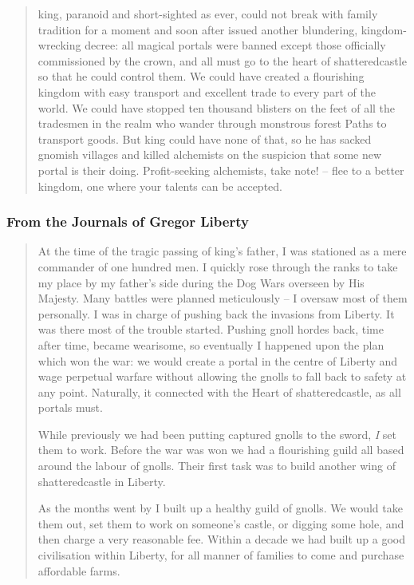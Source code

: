 \begin{multicols}{2}
\begin{quotation}
  \Gls{king}, paranoid and short-sighted as ever, could not break with family tradition for a moment and soon after issued another blundering, kingdom-wrecking decree: all magical portals were banned except those officially commissioned by the crown, and all must go to the heart of \gls{shatteredcastle} so that he could control them.
  We could have created a flourishing kingdom with easy transport and excellent trade to every part of the world.
  We could have stopped ten thousand blisters on the feet of all the tradesmen in the realm who wander through monstrous forest Paths to transport goods.
  But \gls{king} could have none of that, so he has sacked gnomish villages and killed alchemists on the suspicion that some new portal is their doing.
  Profit-seeking alchemists, take note! -- flee to a better kingdom, one where your talents can be accepted.

\end{quotation}

\subsubsection{From the Journals of Gregor Liberty}


\begin{quotation}

  At the time of the tragic passing of \gls{king}'s father, I was stationed as a mere commander of one hundred men.
  I quickly rose through the ranks to take my place by my father's side during the Dog Wars overseen by His Majesty.
  Many battles were planned meticulously -- I oversaw most of them personally.
  I was in charge of pushing back the invasions from Liberty.
  It was there most of the trouble started.
  Pushing gnoll hordes back, time after time, became wearisome, so eventually I happened upon the plan which won the war: we would create a portal in the centre of Liberty and wage perpetual warfare without allowing the gnolls to fall back to safety at any point.
  Naturally, it connected with the Heart of \gls{shatteredcastle}, as all portals must.

  While previously we had been putting captured gnolls to the sword, \emph{I} set them to work.
  Before the war was won we had a flourishing guild all based around the labour of gnolls.
  Their first task was to build another wing of \gls{shatteredcastle} in Liberty.

  As the months went by I built up a healthy guild of gnolls.
  We would take them out, set them to work on someone's castle, or digging some hole, and then charge a very reasonable fee.
  Within a decade we had built up a good civilisation within Liberty, for all manner of families to come and purchase affordable farms.


\end{quotation}
\end{multicols}
